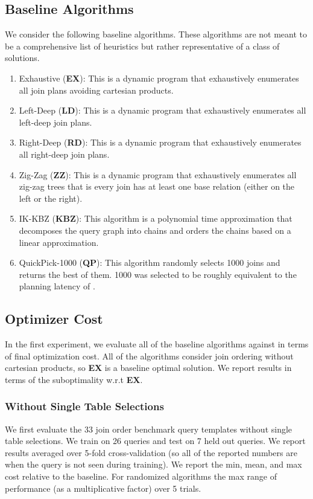 \subsection{Baseline Algorithms}
We consider the following baseline algorithms. These algorithms are not meant to be a comprehensive list of heuristics but rather representative of a class of solutions.

\begin{enumerate}
    \item Exhaustive (\textbf{EX}): This is a dynamic program that exhaustively enumerates all join plans avoiding cartesian products.
    \item Left-Deep (\textbf{LD}): This is a dynamic program that exhaustively enumerates all left-deep join plans.
    \item Right-Deep (\textbf{RD}): This is a dynamic program that exhaustively enumerates all right-deep join plans.
    \item Zig-Zag (\textbf{ZZ}): This is a dynamic program that exhaustively enumerates all zig-zag trees that is every join has at least one base relation (either on the left or the right).
    \item IK-KBZ (\textbf{KBZ}): This algorithm is a polynomial time approximation that decomposes the query graph into chains and orders the chains based on a linear approximation.
    \item QuickPick-1000 (\textbf{QP}): This algorithm randomly selects 1000 joins and returns the best of them. 1000 was selected to be roughly equivalent to the planning latency of \sys.
\end{enumerate}

\subsection{Optimizer Cost}
In the first experiment, we evaluate all of the baseline algorithms against \sys in terms of final optimization cost. All of the algorithms consider join ordering without cartesian products, so \textbf{EX} is a baseline optimal solution. We report results in terms of the suboptimality w.r.t \textbf{EX}.

\subsubsection{Without Single Table Selections}
We first evaluate the 33 join order benchmark query templates without single table selections. We train on 26 queries and test on 7 held out queries. We report results averaged over 5-fold cross-validation (so all of the reported numbers are when the query is not seen during training). We report the min, mean, and max cost relative to the baseline.  For randomized algorithms the max range of performance (as a multiplicative factor) over 5 trials.

